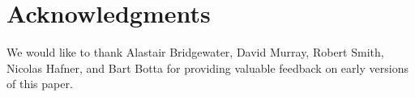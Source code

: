 \section{Acknowledgments} 

We would like to thank Alastair Bridgewater, David Murray, Robert
Smith, Nicolas Hafner, and Bart Botta for providing valuable feedback
on early versions of this paper.
